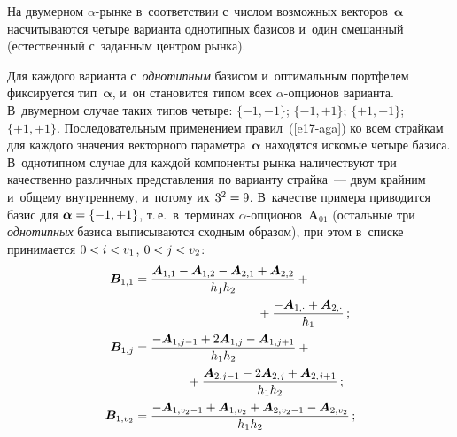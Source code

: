 \begin{multicols}{2}
  На двумерном $\alpha$-рын\-ке в~соответствии с~чис\-лом возможных 
векторов~$\bm{\alpha}$ насчитываются четыре варианта однотипных базисов 
и~один смешанный (естественный с~заданным центром рынка). 
  
  Для каждого варианта с~\textit{однотипным} базисом и~оптимальным 
портфелем фиксируется тип~$\bm{\alpha}$, и~он становится типом всех  
$\alpha$-оп\-ци\-онов варианта. В~двумерном случае таких типов четыре: $\{-1, -
1\}$; $\{-1,+1\}$; $\{+1,-1\}$; $\{+1,+1\}$. Последовательным применением 
правил~(\ref{e17-aga}) ко всем страйкам для каж\-до\-го значения векторного 
параметра~$\bm{\alpha}$ находятся искомые четыре базиса. В~однотипном случае 
для каждой компоненты рынка наличествуют три качественно различных 
представления по варианту страйка~--- двум крайним и~общему внутреннему, 
и~потому их $3^2\hm=9$. В~качестве примера приводится базис для 
$\bm{\alpha}\hm=\{-1,+1\}$, т.\,е.\ в~терминах $\alpha$-оп\-ци\-онов~$\bm{A}_{01}$ 
(остальные три \textit{однотипных} базиса выписываются сходным образом), 
при этом в~списке принимается $0\hm<i \hm< v_1$, $0 \hm< j \hm< v_2$: 
  \begin{align*}
  \bm{B}_{1,1}&=\fr{\bm{A}_{1,1}- \bm{A}_{1,2} -
\bm{A}_{2,1}+\bm{A}_{2,2}}{h_1h_2}+{}\\
&\hspace*{35mm}{}+ \fr{-\bm{A}_{1,\cdot} +\bm{A}_{2,\cdot}}{h_1}\,;\\
  \bm{B}_{1,j} &= \fr{-\bm{A}_{1,j-1} +2\bm{A}_{1,j} -\bm{A}_{1,j+1}}{h_1h_2}+{}\\
  &  \hspace*{15mm} {}+
\fr{\bm{A}_{2,j-1} -2\bm{A}_{2,j} +\bm{A}_{2,j+1}}{h_1h_2}\,;\\
   \bm{B}_{1,v_2}&= \fr{-\bm{A}_{1,v_2-1} +\bm{A}_{1,v_2} +\bm{A}_{2,v_2-1}- \bm{A}_{2,v_2}}{h_1h_2}\,;
  \end{align*}
  

\end{multicols}
